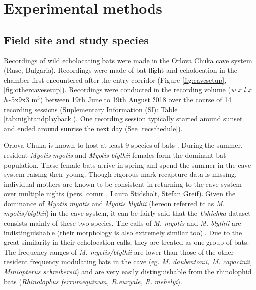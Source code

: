 \documentclass[
]{book}
\begin{document}
\hypertarget{experimental-methods}{%
\section{Experimental methods}\label{experimental-methods}}

\hypertarget{field-site-and-study-species}{%
\subsection{Field site and study species}\label{field-site-and-study-species}}

Recordings of wild echolocating bats were made in the Orlova Chuka cave system (Ruse, Bulgaria). Recordings were made of bat flight and echolocation in the chamber first encountered after the entry corridor (Figure \ref{fig:cavesetup}, \ref{fig:othercavesetup}). Recordings were conducted in the recording volume (\emph{w x l x h}\textasciitilde5x9x3 m\(^{3}\)) between 19th June to 19th August 2018 over the course of 14 recording sessions (Suplementary Information (SI): Table \ref{tab:nightandplayback}). One recording session typically started around sunset and ended around sunrise the next day (See \ref{recschedule}).

Orlova Chuka is known to host at least 9 species of bats \citep{ivanova2005important, govtbatcount}. During the summer, resident \emph{Myotis myotis} and \emph{Myotis blythii} females form the dominant bat population. These female bats arrive in spring and spend the summer in the cave system raising their young. Though rigorous mark-recapture data is missing, individual mothers are known to be consistent in returning to the cave system over multiple nights (pers. comm., Laura Stidsholt, Stefan Greif). Given the dominance of \emph{Myotis myotis} and \emph{Myotis blythii} (hereon referred to as \emph{M. myotis/blythii}) in the cave system, it can be fairly said that the \emph{Ushichka} dataset consists mainly of these two species. The calls of \emph{M. myotis} and \emph{M. blythii} are indistinguishable (their morphology is also extremely similar too) \citep{dietz2016bats}. Due to the great similarity in their echolocation calls, they are treated as one group of bats. The frequency ranges of \emph{M. myotis/blythii} are lower than those of the other resident frequency modulating bats in the cave (eg. \emph{M. daubentonii, M. capacinii, Miniopterus schreibersii}) and are very easily distinguishable from the rhinolophid bats (\emph{Rhinolophus ferrumequinum, R.euryale, R. mehelyi})\citep{dietz2016bats}.
\end{document}
